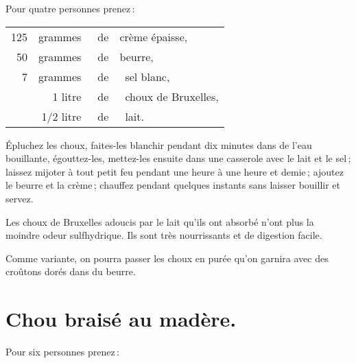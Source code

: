 Pour quatre personnes prenez :

\footnotesize
\begin{longtable}{rrrp{16em}}
    125 & grammes   & de & crème épaisse,                                                                 \\
     50 & grammes   & de & beurre,                                                                        \\
      7 & grammes   & de & sel blanc,                                                                     \\
        & 1 litre   & de & choux de Bruxelles,                                                            \\
        & 1/2 litre & de & lait.                                                                          \\
\end{longtable}
\normalsize

Épluchez les choux, faites-les blanchir pendant dix minutes dans de l’eau
bouillante, égouttez-les, mettez-les ensuite dans une casserole avec le lait et
le sel ; laissez mijoter à tout petit feu pendant une heure à une heure et
demie ; ajoutez le beurre et la crème ; chauffez pendant quelques instants sans
laisser bouillir et servez.

Les choux de Bruxelles adoucis par le lait qu'ils ont absorbé n'ont plus la
moindre odeur sulfhydrique. Ils sont très nourrissants et de digestion facile.

\sk

Comme variante, on pourra passer les choux en purée qu'on garnira avec des
croûtons dorés dans du beurre.

\section*{\centering Chou braisé au madère.}
{}

Pour six personnes prenez :

